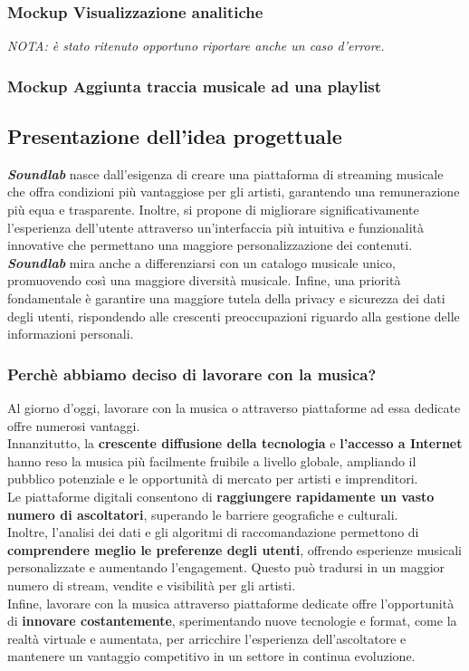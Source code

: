 \documentclass{article}
\begin{document}
			\subsubsection{Mockup Visualizzazione analitiche}
			\textit{NOTA: è stato ritenuto opportuno riportare anche un caso d'errore.}
			
			
			\subsubsection{Mockup Aggiunta traccia musicale ad una playlist}
			
		\subsection{Presentazione dell'idea progettuale}
		\textbf{\textit{\textcolor{dark_purple}{Soundlab}}} nasce dall'esigenza di creare una piattaforma di streaming musicale che offra condizioni più vantaggiose per gli artisti, garantendo una remunerazione più equa e trasparente. Inoltre, si propone di migliorare significativamente l'esperienza dell'utente attraverso un'interfaccia più intuitiva e funzionalità innovative che permettano una maggiore personalizzazione dei contenuti.\\
		\textbf{\textit{\textcolor{dark_purple}{Soundlab}}} mira anche a differenziarsi con un catalogo musicale unico, promuovendo così una maggiore diversità musicale. Infine, una priorità fondamentale è garantire una maggiore tutela della privacy e sicurezza dei dati degli utenti, rispondendo alle crescenti preoccupazioni riguardo alla gestione delle informazioni personali.
		
			\subsubsection{Perchè abbiamo deciso di lavorare con la musica?}
			Al giorno d'oggi, lavorare con la musica o attraverso piattaforme ad essa dedicate offre numerosi vantaggi.\\ Innanzitutto, la \textbf{crescente diffusione della tecnologia} e \textbf{l'accesso a Internet} hanno reso la musica più facilmente fruibile a livello globale, ampliando il pubblico potenziale e le opportunità di mercato per artisti e imprenditori. \\Le piattaforme digitali consentono di \textbf{raggiungere rapidamente un vasto numero di ascoltatori}, superando le barriere geografiche e culturali.\\Inoltre, l'analisi dei dati e gli algoritmi di raccomandazione permettono di \textbf{comprendere meglio le preferenze degli utenti}, offrendo esperienze musicali personalizzate e aumentando l'engagement. Questo può tradursi in un maggior numero di stream, vendite e visibilità per gli artisti.\\
			Infine, lavorare con la musica attraverso piattaforme dedicate offre l'opportunità di \textbf{innovare costantemente}, sperimentando nuove tecnologie e format, come la realtà virtuale e aumentata, per arricchire l'esperienza dell'ascoltatore e mantenere un vantaggio competitivo in un settore in continua evoluzione.
\end{document}
